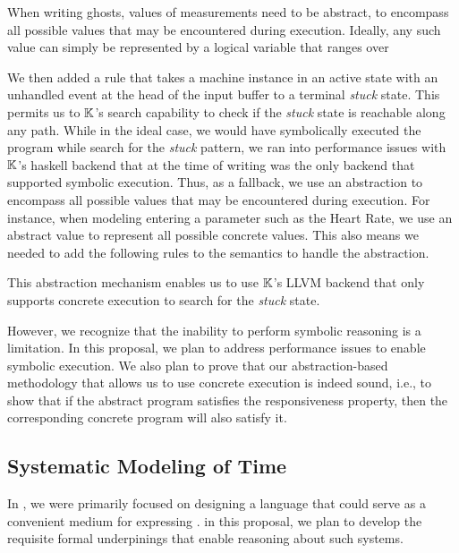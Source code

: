 When writing ghosts, values of measurements need to be abstract, to
encompass all possible values that may be encountered during execution.
Ideally, any such value can simply be represented by a logical variable
that ranges over

We then added a rule that takes a machine instance in an active state
with an unhandled event at the head of the input buffer to a terminal \emph{stuck}
state. This permits us to $\mathbb{K}$'s search capability to check if the \emph{stuck}
state is reachable along any path.
While in the ideal case, we would have symbolically executed the program while
search for the \emph{stuck} pattern, we ran into performance issues
with $\mathbb{K}$'s haskell backend that at the time of writing was the only backend
that supported symbolic execution. Thus, as a fallback, we
use an abstraction to
encompass all possible values that may be encountered during execution.
For instance, when modeling entering a parameter such as the Heart Rate,
we use an abstract value to represent all possible concrete values.
This also means we needed to add the following rules to the semantics to
handle the abstraction.

This abstraction mechanism enables us to use $\mathbb{K}$'s LLVM backend
that only supports concrete execution to search for the \emph{stuck}
state.


However, we recognize that the inability to perform symbolic
reasoning is a limitation. In this proposal, we plan to
address performance issues to enable symbolic execution.
We also plan to prove that our abstraction-based methodology
that allows us to use concrete execution is indeed sound, i.e.,
to show that if the abstract program satisfies the responsiveness
property, then the corresponding concrete program will also satisfy it.

\subsection{Systematic Modeling of Time}

In \cite{SaxenaFMCAD23}, we were primarily focused on
designing a language that could serve as a convenient medium for
expressing \BPGs{}. in this proposal, we plan to develop the
requisite formal underpinings that enable reasoning about such systems.



